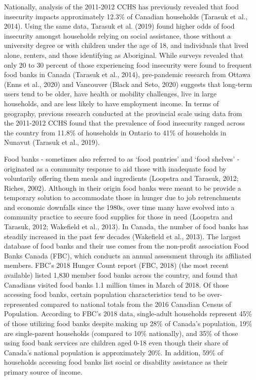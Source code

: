 \documentclass[]{elsarticle} %
\begin{document}
Nationally, analysis of the 2011-2012 CCHS has previously revealed that
food insecurity impacts approximately 12.3\% of Canadian households
(Tarasuk et al., 2014). Using the same data, Tarasuk et al. (2019) found
higher odds of food insecurity amongst households relying on social
assistance, those without a university degree or with children under the
age of 18, and individuals that lived alone, renters, and those
identifying as Aboriginal. While surveys revealed that only 20 to 30
percent of those experiencing food insecurity were found to frequent
food banks in Canada (Tarasuk et al., 2014), pre-pandemic research from
Ottawa (Enns et al., 2020) and Vancouver (Black and Seto, 2020) suggests
that long-term users tend to be older, have health or mobility
challenges, live in large households, and are less likely to have
employment income. In terms of geography, previous research conducted at
the provincial scale using data from the 2011-2012 CCHS found that the
prevalence of food insecurity ranged across the country from 11.8\% of
households in Ontario to 41\% of households in Nunavut (Tarasuk et al.,
2019).

Food banks - sometimes also referred to as `food pantries' and `food
shelves' - originated as a community response to aid those with
inadequate food by voluntarily offering them meals and ingredients
(Loopstra and Tarasuk, 2012; Riches, 2002). Although in their origin
food banks were meant to be provide a temporary solution to accommodate
those in hunger due to job retrenchments and economic downfalls since
the 1980s, over time many have evolved into a community practice to
secure food supplies for those in need (Loopstra and Tarasuk, 2012;
Wakefield et al., 2013). In Canada, the number of food banks has
steadily increased in the past few decades (Wakefield et al., 2013). The
largest database of food banks and their use comes from the non-profit
association Food Banks Canada (FBC), which conducts an annual assessment
through its affiliated members. FBC's 2018 Hunger Count report (FBC,
2018) (the most recent available) listed 1,830 member food banks across
the country, and found that Canadians visited food banks 1.1 million
times in March of 2018. Of those accessing food banks, certain
population characteristics tend to be over-represented compared to
national totals from the 2016 Canadian Census of Population. According
to FBC's 2018 data, single-adult households represent 45\% of those
utilizing food banks despite making up 28\% of Canada's population, 19\%
are single-parent households (compared to 10\% nationally), and 35\% of
those using food bank services are children aged 0-18 even though their
share of Canada's national population is approximately 20\%. In
addition, 59\% of households accessing food banks list social or
disability assistance as their primary source of income.
\end{document}
